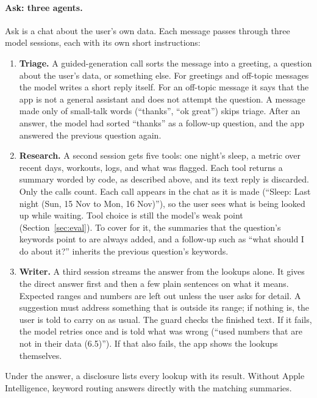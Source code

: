 \documentclass[11pt,a4paper]{article}
\begin{document}
\paragraph{Ask: three agents.} Ask is a chat about the user's own data. Each message passes through three model sessions, each with its own short instructions:

\begin{enumerate}
  \item \textbf{Triage.} A guided-generation call sorts the message into a greeting, a question about the user's data, or something else. For greetings and off-topic messages the model writes a short reply itself. For an off-topic message it says that the app is not a general assistant and does not attempt the question. A message made only of small-talk words (``thanks'', ``ok great'') skips triage. After an answer, the model had sorted ``thanks'' as a follow-up question, and the app answered the previous question again.
  \item \textbf{Research.} A second session gets five tools: one night's sleep, a metric over recent days, workouts, logs, and what was flagged. Each tool returns a summary worded by code, as described above, and its text reply is discarded. Only the calls count. Each call appears in the chat as it is made (``Sleep: Last night (Sun, 15 Nov to Mon, 16 Nov)''), so the user sees what is being looked up while waiting. Tool choice is still the model's weak point (Section~\ref{sec:eval}). To cover for it, the summaries that the question's keywords point to are always added, and a follow-up such as ``what should I do about it?'' inherits the previous question's keywords.
  \item \textbf{Writer.} A third session streams the answer from the lookups alone. It gives the direct answer first and then a few plain sentences on what it means. Expected ranges and numbers are left out unless the user asks for detail. A suggestion must address something that is outside its range; if nothing is, the user is told to carry on as usual. The guard checks the finished text. If it fails, the model retries once and is told what was wrong (``used numbers that are not in their data (6.5)''). If that also fails, the app shows the lookups themselves.
\end{enumerate}

\noindent Under the answer, a disclosure lists every lookup with its result. Without Apple Intelligence, keyword routing answers directly with the matching summaries.
\end{document}
